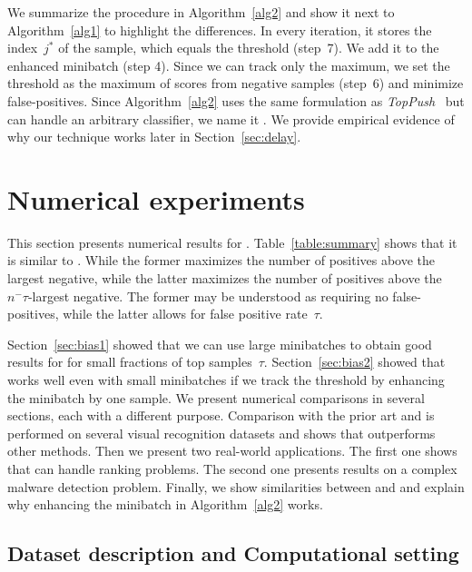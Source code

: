 We summarize the procedure in Algorithm~\ref{alg2} and show it next to Algorithm~\ref{alg1} to highlight the differences. In every iteration, it stores the index~$j^*$ of the sample, which equals the threshold (step~7). We add it to the enhanced minibatch (step 4). Since we can track only the maximum, we set the threshold as the maximum of scores from negative samples (step~6) and minimize false-positives. Since Algorithm~\ref{alg2} uses the same formulation as \textit{TopPush}~\cite{li2014top} but can handle an arbitrary classifier, we name it \DeepTopPush. We provide empirical evidence of why our technique works later in Section~\ref{sec:delay}.

\section{Numerical experiments}\label{sec:numerics}

This section presents numerical results for \DeepTopPush. Table~\ref{table:summary} shows that it is similar to \PatMatNP. While the former maximizes the number of positives above the largest negative, while the latter maximizes the number of positives above the~$n^-\tau$-largest negative. The former may be understood as requiring no false-positives, while the latter allows for false positive rate~$\tau$.

Section~\ref{sec:bias1} showed that we can use large minibatches to obtain good results for \PatMatNP for small fractions of top samples~$\tau$. Section~\ref{sec:bias2} showed that \DeepTopPush works well even with small minibatches if we track the threshold by enhancing the minibatch by one sample. We present numerical comparisons in several sections, each with a different purpose. Comparison with the prior art \TFCO and \APPerf is performed on several visual recognition datasets and shows that \DeepTopPush outperforms other methods. Then we present two real-world applications. The first one shows that \DeepTopPush can handle ranking problems. The second one presents results on a complex malware detection problem. Finally, we show similarities between \DeepTopPush and \PatMatNP and explain why enhancing the minibatch in Algorithm~\ref{alg2} works.

\subsection{Dataset description and Computational setting}\label{sec:set}

